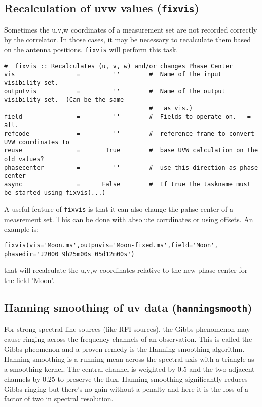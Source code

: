 \subsection{Recalculation of uvw values ({\tt fixvis})}
\label{section:cal.other.fixvis}

Sometimes the u,v,w coordinates of a measurement set are not recorded
correctly by the correlator. In those cases, it may be necessary to
recalculate them based on the antenna positions. {\tt fixvis} will
perform this task.


\small
\begin{verbatim}
#  fixvis :: Recalculates (u, v, w) and/or changes Phase Center 
vis                 =         ''        #  Name of the input visibility set.
outputvis           =         ''        #  Name of the output visibility set.  (Can be the same
                                        #   as vis.)
field               =         ''        #  Fields to operate on.   = all.
refcode             =         ''        #  reference frame to convert UVW coordinates to
reuse               =       True        #  base UVW calculation on the old values?
phasecenter         =         ''        #  use this direction as phase center
async               =      False        #  If true the taskname must be started using fixvis(...)
\end{verbatim}
\normalsize

A useful feature of {\tt fixvis} is that it can also change the pahse
center of a measrement set. This can be done with absolute corrdinates
or using offsets. An example is:
\small
\begin{verbatim}
fixvis(vis='Moon.ms',outpuvis='Moon-fixed.ms',field='Moon', phasedir='J2000 9h25m00s 05d12m00s')
\end{verbatim}
\normalsize

that will recalculate the u,v,w coordinates relative to the new phase
center for the field 'Moon'.



\subsection{Hanning smoothing of uv data ({\tt hanningsmooth})}
\label{section:cal.other.hanningsmooth}

For strong spectral line sources (like RFI sources), the Gibbs
phenomenon may cause ringing across the frequency channels of an
observation. This is called the Gibbs pheomenon and a proven remedy is
the Hanning smoothing algorithm. Hanning smoothing is a running mean
across the spectral axis with a triangle as a smoothing kernel. The
central channel is weighted by 0.5 and the two adjacent channels by
0.25 to preserve the flux. Hanning smoothing significantly reduces
Gibbs ringing but there's no gain without a penalty and here it is the
loss of a factor of two in spectral resolution.

